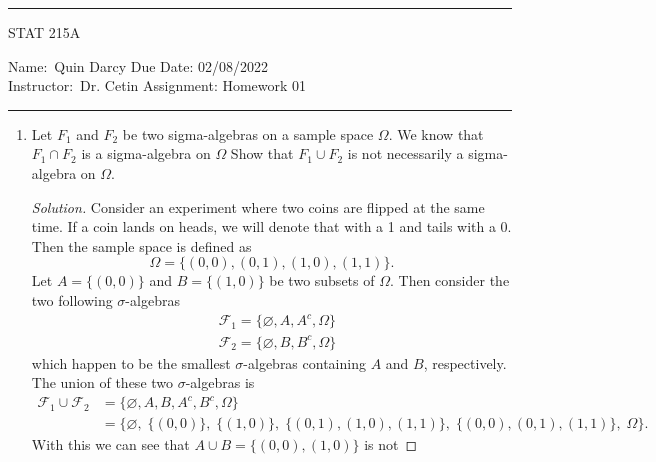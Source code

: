 \documentclass[12pt]{article}
\newenvironment{solution}
{\renewcommand\qedsymbol{$\blacksquare$}\begin{proof}[Solution]}
{\end{proof}}
\begin{document}
    \thispagestyle{empty}\hrule

    \begin{center}
        \vspace{.4cm} { \large STAT 215A}
    \end{center}
    {Name:\ Quin Darcy \hspace{\fill} Due Date: 02/08/2022   \\
    { Instructor:}\ Dr. Cetin \hspace{\fill} Assignment:
    Homework 01 \\ \hrule}

    \begin{enumerate}
        \item Let $F_1$ and $F_2$ be two sigma-algebras on a sample space
            $\Omega$. We know that $F_1\cap F_2$ is a sigma-algebra on $\Omega$ 
            Show that $F_1\cup F_2$ is not necessarily
            a sigma-algebra on $\Omega$. 
            \begin{solution}
                Consider an experiment where two coins are flipped at the same
                time. If a coin lands on heads, we will denote that with
                a 1 and tails with a 0. Then the sample space is defined as 
                \begin{equation*}
                    \Omega=\{(0, 0), (0, 1), (1, 0), (1, 1)\}.
                \end{equation*}
                Let $A=\{(0, 0)\}$ and $B=\{(1, 0)\}$ be two subsets of
                $\Omega$. Then consider the two following $\sigma$-algebras
                \begin{align*}
                    &\mathcal{F}_1=\{\varnothing, A, A^c, \Omega\} \\
                    &\mathcal{F}_2=\{\varnothing, B, B^c, \Omega\}
                \end{align*}
                which happen to be the smallest $\sigma$-algebras containing
                $A$ and $B$, respectively. The union of these two
                $\sigma$-algebras is 
                \begin{align*}
                    \mathcal{F}_1\cup\mathcal{F}_2&=\{\varnothing, A, B, A^c,
                    B^c, \Omega\} \\
                    &=\bigg\{\varnothing, \;\{(0, 0)\}, \;\{(1, 0)\}, \;\{(0, 1), (1, 0),
                    (1, 1)\}, \;\{(0, 0), (0, 1), (1, 1)\}, \;\Omega\bigg\}.
                \end{align*}
                With this we can see that $A\cup B=\{(0, 0), (1, 0)\}$ is not

\end{solution}
\end{enumerate}
\end{document}
